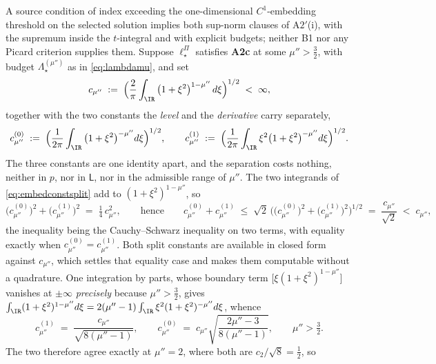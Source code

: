 \begin{lemma}\label{lem:reprsmooth}
A source condition of index exceeding the one-dimensional $C^{1}$-embedding threshold on the selected
solution implies both sup-norm clauses of A$2'$(i), with the supremum inside the $t$-integral and with
explicit budgets; neither B1 nor any Picard criterion supplies them.
Suppose $\ell^\Pi_\star$ satisfies \textbf{A2c} at some $\mu''>\tfrac32$, with budget
$\Lambda^{(\mu'')}_\star$ as in \eqref{eq:lambdamu}, and set
\begin{equation}\label{eq:embedconst}
c_{\mu''}\;:=\;\Big(\frac{2}{\pi}\int_{\IR}\big(1+\xi^{2}\big)^{1-\mu''}\,d\xi\Big)^{1/2}\;<\;\infty ,
\end{equation}
together with the two constants the \emph{level} and the \emph{derivative} carry separately,
\begin{equation}\label{eq:embedconstsplit}
c^{(0)}_{\mu''}\;:=\;\Big(\frac{1}{2\pi}\int_{\IR}\big(1+\xi^{2}\big)^{-\mu''}d\xi\Big)^{1/2},
\qquad
c^{(1)}_{\mu''}\;:=\;\Big(\frac{1}{2\pi}\int_{\IR}\xi^{2}\big(1+\xi^{2}\big)^{-\mu''}d\xi\Big)^{1/2}.
\end{equation}
The three constants are one identity apart, and the separation costs nothing, neither in $p$,
nor in $\mathsf L$, nor in the admissible range of $\mu''$. The two integrands of
\eqref{eq:embedconstsplit} add to $(1+\xi^{2})^{1-\mu''}$, so
\begin{equation}\label{eq:embedconstid}
\big(c^{(0)}_{\mu''}\big)^{2}+\big(c^{(1)}_{\mu''}\big)^{2}\;=\;\tfrac14\,c^{2}_{\mu''},
\qquad\text{hence}\qquad
c^{(0)}_{\mu''}+c^{(1)}_{\mu''}\;\le\;\sqrt2\,\Big(\big(c^{(0)}_{\mu''}\big)^{2}+\big(c^{(1)}_{\mu''}\big)^{2}\Big)^{1/2}
\;=\;\frac{c_{\mu''}}{\sqrt2}\;<\;c_{\mu''},
\end{equation}
the inequality being the Cauchy--Schwarz inequality on two terms, with equality exactly when
$c^{(0)}_{\mu''}=c^{(1)}_{\mu''}$. Both split constants are available in closed form against
$c_{\mu''}$, which settles that equality case and makes them computable without a quadrature. One
integration by parts, whose boundary term $\big[\xi(1+\xi^{2})^{1-\mu''}\big]$ vanishes at $\pm\infty$
\emph{precisely} because $\mu''>\tfrac32$, gives
$\int_{\IR}(1+\xi^{2})^{1-\mu''}d\xi=2(\mu''-1)\int_{\IR}\xi^{2}(1+\xi^{2})^{-\mu''}d\xi$, whence
\[
c^{(1)}_{\mu''}\;=\;\frac{c_{\mu''}}{\sqrt{8(\mu''-1)}},
\qquad
c^{(0)}_{\mu''}\;=\;c_{\mu''}\sqrt{\frac{2\mu''-3}{8(\mu''-1)}},
\qquad \mu''>\tfrac32 .
\]
The two therefore agree exactly at $\mu''=2$, where both are $c_{2}/\sqrt8=\tfrac12$, so

\end{lemma}
